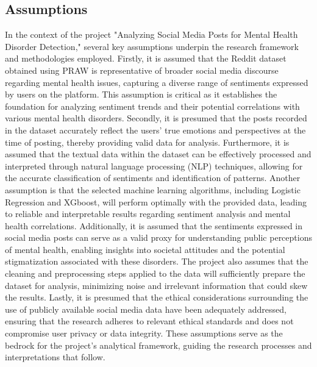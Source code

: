 \subsection{Assumptions}
\noindent
In the context of the project "Analyzing Social Media Posts for Mental Health Disorder Detection," several key assumptions underpin the research framework and methodologies employed. Firstly, it is assumed that the Reddit dataset obtained using PRAW is representative of broader social media discourse regarding mental health issues, capturing a diverse range of sentiments expressed by users on the platform. This assumption is critical as it establishes the foundation for analyzing sentiment trends and their potential correlations with various mental health disorders. Secondly, it is presumed that the posts recorded in the dataset accurately reflect the users' true emotions and perspectives at the time of posting, thereby providing valid data for analysis. Furthermore, it is assumed that the textual data within the dataset can be effectively processed and interpreted through natural language processing (NLP) techniques, allowing for the accurate classification of sentiments and identification of patterns. Another assumption is that the selected machine learning algorithms, including Logistic Regression and XGboost, will perform optimally with the provided data, leading to reliable and interpretable results regarding sentiment analysis and mental health correlations. Additionally, it is assumed that the sentiments expressed in social media posts can serve as a valid proxy for understanding public perceptions of mental health, enabling insights into societal attitudes and the potential stigmatization associated with these disorders. The project also assumes that the cleaning and preprocessing steps applied to the data will sufficiently prepare the dataset for analysis, minimizing noise and irrelevant information that could skew the results. Lastly, it is presumed that the ethical considerations surrounding the use of publicly available social media data have been adequately addressed, ensuring that the research adheres to relevant ethical standards and does not compromise user privacy or data integrity. These assumptions serve as the bedrock for the project's analytical framework, guiding the research processes and interpretations that follow.

